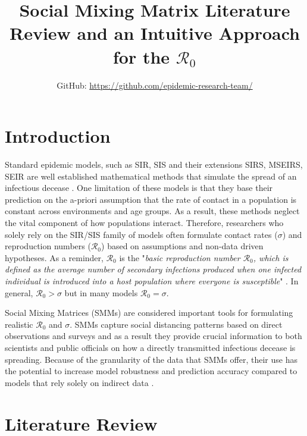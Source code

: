\documentclass[12pt]{article}
\title{Social Mixing Matrix Literature Review and an Intuitive Approach for the $\mathcal{R}_{0}$}
\author{GitHub: \url{https://github.com/epidemic-research-team/}}
\begin{document}
\maketitle

\section{Introduction}

Standard epidemic models, such as SIR, SIS and their extensions  SIRS, MSEIRS, SEIR are well established mathematical methods that simulate the spread of an infectious decease \cite{keeling2008modeling, ma2009mathematical, li2018introduction}. One limitation of these models is that they base their prediction on the a-priori assumption that the rate of contact in a population is constant across environments and age groups. As a result, these methods neglect the vital component of how populations interact. Therefore, researchers who solely rely on the SIR/SIS family of models often formulate contact rates ($\sigma$) and reproduction numbers ($\mathcal{R}_{0} $) based on assumptions and non-data driven hypotheses. As a reminder, $\mathcal{R}_{0} $ is the "\textit{basic reproduction number $\mathcal{R}_{0}$, which is defined as the average number of secondary infections produced when one infected individual is introduced into a host population where everyone is susceptible}" \cite[p.21]{ma2009mathematical}. In general, $\mathcal{R}_{0} >\sigma$ but in many models $\mathcal{R}_{0} =\sigma$. 

Social Mixing Matrices (SMMs) are considered important tools for formulating realistic $\mathcal{R}_{0}$ and $\sigma$. SMMs capture social distancing patterns based on direct observations and surveys and as a result they provide crucial information to both scientists and public officials on how a directly transmitted infectious decease is spreading. Because of the granularity of the data that SMMs offer, their use has the potential to increase model robustness and prediction accuracy compared to models that rely solely on indirect data \cite{Mossong:2008, Baguelin:2013}. 

\section{Literature Review}
\end{document}
